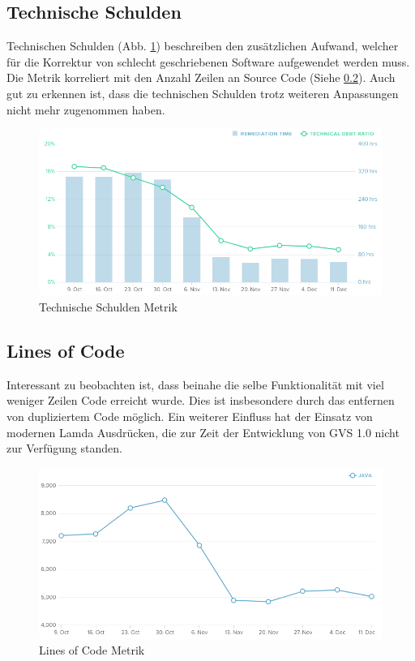 \documentclass[11pt,a4paper,english,oneside]{book}
\numberwithin{equation}{chapter}
\begin{document}
	\subsection{Technische Schulden}
	Technischen Schulden (Abb. \ref{fig:metric-technical-debt}) beschreiben den zusätzlichen Aufwand, welcher für die Korrektur von schlecht geschriebenen Software aufgewendet werden muss. Die Metrik korreliert mit den Anzahl Zeilen an Source Code (Siehe \ref{ssec:lines-code}). Auch gut zu erkennen ist, dass die technischen Schulden trotz weiteren Anpassungen nicht mehr zugenommen haben.
	\begin{figure}[h!]
		\centering
		\includegraphics[width=0.7\linewidth]{assets/images/metrics/technical_debt}
		\caption{Technische Schulden Metrik}
		\label{fig:metric-technical-debt}
	\end{figure}
	
	\subsection{Lines of Code} \label{ssec:lines-code}
	Interessant zu beobachten ist, dass beinahe die selbe Funktionalität mit viel weniger Zeilen Code erreicht wurde. Dies ist insbesondere durch das entfernen von dupliziertem Code möglich. Ein weiterer Einfluss hat der Einsatz von modernen Lamda Ausdrücken, die zur Zeit der Entwicklung von GVS 1.0 nicht zur Verfügung standen.
	\begin{figure}[h!]
		\centering
		\includegraphics[width=0.7\linewidth]{assets/images/metrics/lines_of_code}
		\caption{Lines of Code Metrik}
		\label{metric-linesofcode}
	\end{figure}	
	
\end{document}
